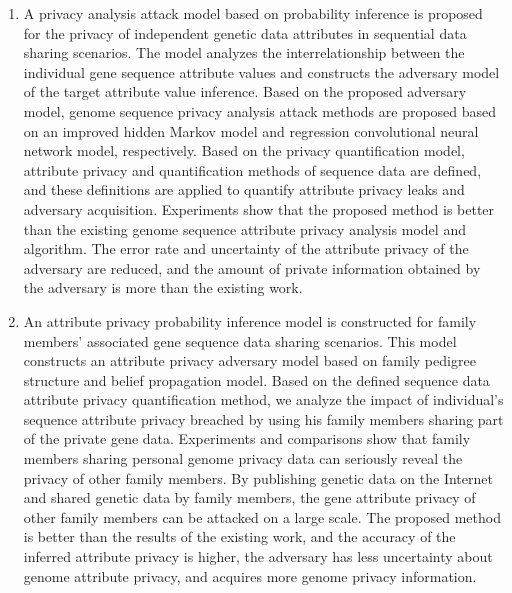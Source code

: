 \begin{englishabstract}
\begin{enumerate}
		
		\item 	
		A privacy analysis attack model based on probability inference is proposed for the privacy of independent genetic data attributes in sequential data sharing scenarios. The model analyzes the interrelationship between the individual gene sequence attribute values and constructs the adversary model of the target attribute value inference. Based on the proposed adversary model, genome sequence privacy analysis attack methods are proposed based on an improved hidden Markov model and regression convolutional neural network model, respectively. Based on the privacy quantification model, attribute privacy and quantification methods of sequence data are defined, and these definitions are applied to quantify attribute privacy leaks and adversary acquisition. Experiments show that the proposed method is better than the existing genome sequence attribute privacy analysis model and algorithm. The error rate and uncertainty of the attribute privacy of the adversary are reduced, and the amount of private information obtained by the adversary is more than the existing work.
		
		\item 	
		An attribute privacy probability inference model is constructed for family members' associated gene sequence data sharing scenarios. This model constructs an attribute privacy adversary model based on family pedigree structure and belief propagation model. Based on the defined sequence data attribute privacy quantification method, we analyze the impact of individual's sequence attribute privacy breached by using his family members sharing part of the private gene data. Experiments and comparisons show that family members sharing personal genome privacy data can seriously reveal the privacy of other family members. By publishing genetic data on the Internet and shared genetic data by family members, the gene attribute privacy of other family members can be attacked on a large scale. The proposed method is better than the results of the existing work, and the accuracy of the inferred attribute privacy is higher, the adversary has less uncertainty about genome attribute privacy, and acquires more genome privacy information.
		

\end{enumerate}
\end{englishabstract}
